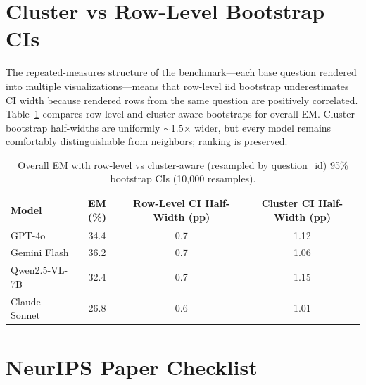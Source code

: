 \documentclass{article}
\begin{document}
\section{Cluster vs Row-Level Bootstrap CIs}
\label{sec:bootstrap_compare}
The repeated-measures structure of the benchmark---each base question rendered into multiple visualizations---means that row-level iid bootstrap underestimates CI width because rendered rows from the same question are positively correlated. Table~\ref{tab:bootstrap_compare} compares row-level and cluster-aware bootstraps for overall EM. Cluster bootstrap half-widths are uniformly $\sim$1.5$\times$ wider, but every model remains comfortably distinguishable from neighbors; ranking is preserved.

\begin{table}[h]
\centering
\small
\caption{Overall EM with row-level vs cluster-aware (resampled by question\_id) 95\% bootstrap CIs (10{,}000 resamples).}
\label{tab:bootstrap_compare}
\begin{tabular}{lccc}
\toprule
Model & EM (\%) & Row-Level CI Half-Width (pp) & Cluster CI Half-Width (pp) \\
\midrule
GPT-4o        & 34.4 & 0.7 & 1.12 \\
Gemini Flash  & 36.2 & 0.7 & 1.06 \\
Qwen2.5-VL-7B & 32.4 & 0.7 & 1.15 \\
Claude Sonnet & 26.8 & 0.6 & 1.01 \\
\bottomrule
\end{tabular}
\end{table}

\newpage
\section*{NeurIPS Paper Checklist}
\end{document}
